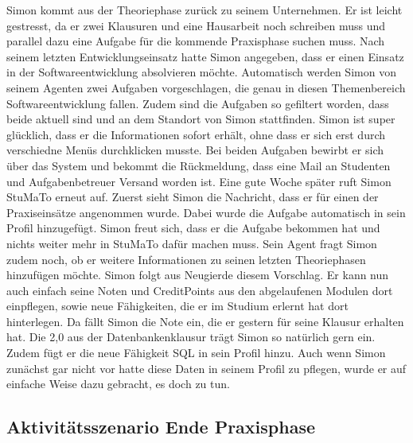 \documentclass[
  12pt,
  ngerman,
  a4paper,
]{article}
\begin{document}
Simon kommt aus der Theoriephase zurück zu seinem Unternehmen. Er ist
leicht gestresst, da er zwei Klausuren und eine Hausarbeit noch
schreiben muss und parallel dazu eine Aufgabe für die kommende
Praxisphase suchen muss. Nach seinem letzten Entwicklungseinsatz hatte
Simon angegeben, dass er einen Einsatz in der Softwareentwicklung
absolvieren möchte. Automatisch werden Simon von seinem Agenten zwei
Aufgaben vorgeschlagen, die genau in diesen Themenbereich
Softwareentwicklung fallen. Zudem sind die Aufgaben so gefiltert worden,
dass beide aktuell sind und an dem Standort von Simon stattfinden. Simon
ist super glücklich, dass er die Informationen sofort erhält, ohne dass
er sich erst durch verschiedne Menüs durchklicken musste. Bei beiden
Aufgaben bewirbt er sich über das System und bekommt die Rückmeldung,
dass eine Mail an Studenten und Aufgabenbetreuer Versand worden ist.
Eine gute Woche später ruft Simon StuMaTo erneut auf. Zuerst sieht Simon
die Nachricht, dass er für einen der Praxiseinsätze angenommen wurde.
Dabei wurde die Aufgabe automatisch in sein Profil hinzugefügt. Simon
freut sich, dass er die Aufgabe bekommen hat und nichts weiter mehr in
StuMaTo dafür machen muss. Sein Agent fragt Simon zudem noch, ob er
weitere Informationen zu seinen letzten Theoriephasen hinzufügen möchte.
Simon folgt aus Neugierde diesem Vorschlag. Er kann nun auch einfach
seine Noten und CreditPoints aus den abgelaufenen Modulen dort
einpflegen, sowie neue Fähigkeiten, die er im Studium erlernt hat dort
hinterlegen. Da fällt Simon die Note ein, die er gestern für seine
Klausur erhalten hat. Die 2,0 aus der Datenbankenklausur trägt Simon so
natürlich gern ein. Zudem fügt er die neue Fähigkeit SQL in sein Profil
hinzu. Auch wenn Simon zunächst gar nicht vor hatte diese Daten in
seinem Profil zu pflegen, wurde er auf einfache Weise dazu gebracht, es
doch zu tun.

\hypertarget{aktivituxe4tsszenario-ende-praxisphase}{%
\subsection{Aktivitätsszenario Ende
Praxisphase}\label{aktivituxe4tsszenario-ende-praxisphase}}
\end{document}
